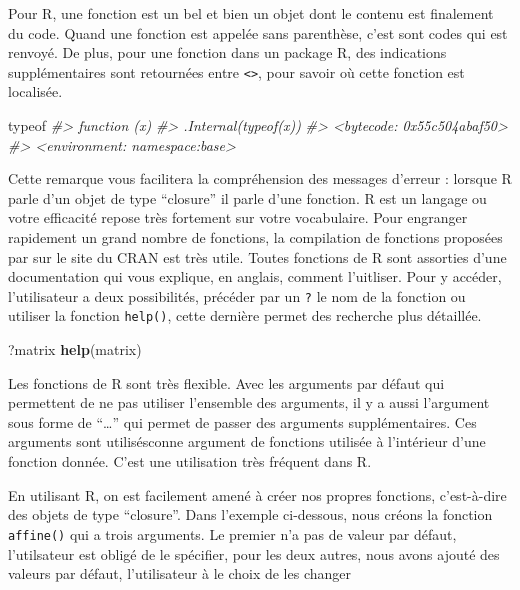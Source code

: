 \documentclass[]{article}
\newenvironment{Shaded}{\begin{snugshade}}{\end{snugshade}}
\newcommand{\CommentTok}[1]{\textcolor[rgb]{0.56,0.35,0.01}{\textit{#1}}}
\newcommand{\KeywordTok}[1]{\textcolor[rgb]{0.13,0.29,0.53}{\textbf{#1}}}
\newcommand{\NormalTok}[1]{#1}
\begin{document}
Pour R, une fonction est un bel et bien un objet dont le contenu est finalement du code. Quand une fonction est appelée sans parenthèse, c'est sont codes qui est renvoyé. De plus, pour une fonction dans un package R, des indications supplémentaires sont retournées entre \texttt{<>}, pour savoir où cette fonction est localisée.

\begin{Shaded}
\begin{Highlighting}[]
\NormalTok{typeof}
\CommentTok{#> function (x) }
\CommentTok{#> .Internal(typeof(x))}
\CommentTok{#> <bytecode: 0x55c504abaf50>}
\CommentTok{#> <environment: namespace:base>}
\end{Highlighting}
\end{Shaded}

Cette remarque vous facilitera la compréhension des messages d'erreur : lorsque R parle d'un objet de type ``closure'' il parle d'une fonction. R est un langage ou votre efficacité repose très fortement sur votre vocabulaire. Pour engranger rapidement un grand nombre de fonctions, la compilation de fonctions proposées par sur le site du CRAN est très utile. Toutes fonctions de R sont assorties d'une documentation qui vous explique, en anglais, comment l'uitliser. Pour y accéder, l'utilisateur a deux possibilités, précéder par un \texttt{?} le nom de la fonction ou utiliser la fonction \texttt{help()}, cette dernière permet des recherche plus détaillée.

\begin{Shaded}
\begin{Highlighting}[]
\NormalTok{?matrix}
\KeywordTok{help}\NormalTok{(matrix)}
\end{Highlighting}
\end{Shaded}

Les fonctions de R sont très flexible. Avec les arguments par défaut qui permettent de ne pas utiliser l'ensemble des arguments, il y a aussi l'argument sous forme de ``\ldots{}'' qui permet de passer des arguments supplémentaires. Ces arguments sont utilisésconne argument de fonctions utilisée à l'intérieur d'une fonction donnée. C'est une utilisation très fréquent dans R.

En utilisant R, on est facilement amené à créer nos propres fonctions, c'est-à-dire des objets de type ``closure''. Dans l'exemple ci-dessous, nous créons la fonction \texttt{affine()} qui a trois arguments. Le premier n'a pas de valeur par défaut, l'utilsateur est obligé de le spécifier, pour les deux autres, nous avons ajouté des valeurs par défaut, l'utilisateur à le choix de les changer
\end{document}
